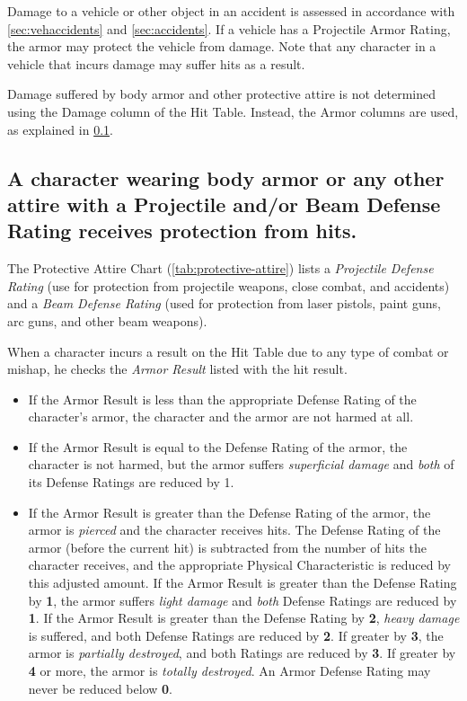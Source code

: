 Damage to a vehicle or other object in an accident is assessed in
accordance with \ref{sec:vehaccidents} and \ref{sec:accidents}. If a
vehicle has a Projectile Armor Rating, the armor may protect the
vehicle from damage. Note that any character in a vehicle that incurs
damage may suffer hits as a result.

Damage suffered by body armor and other protective attire is not
determined using the Damage column of the Hit Table. Instead, the
Armor columns are used, as explained in \ref{sec:armor-defense}.


\subsection[Protection from Armor]{A character wearing body armor or
  any other attire with a 
  Projectile and/or Beam Defense Rating receives protection from
  hits.}
\label{sec:armor-defense}



The Protective Attire Chart (\ref{tab:protective-attire}) lists a
\emph{Projectile Defense Rating} (use for protection from projectile weapons,
close combat, and accidents) and a \emph{Beam Defense Rating} (used for
protection from laser pistols, paint guns, arc guns, and other beam
weapons).

When a character incurs a result on the Hit Table due to any type of
combat or mishap, he checks the \emph{Armor Result} listed with the
hit result.

\begin{itemize}
\item If the Armor Result is less than the appropriate Defense Rating
  of the character's armor, the character and the armor are not harmed
  at all.
\item If the Armor Result is equal to the Defense Rating of the armor,
  the character is not harmed, but the armor suffers \emph{superficial
    damage} and \emph{both} of its Defense Ratings are reduced by 1.
\item If the Armor Result is greater than the Defense Rating of the
  armor, the armor is \emph{pierced} and the character receives hits.
  The Defense Rating of the armor (before the current hit) is
  subtracted from the number of hits the character receives, and the
  appropriate Physical Characteristic is reduced by this adjusted
  amount. If the Armor Result is greater than the Defense Rating by
  \textbf{1}, the armor suffers \emph{light damage} and \emph{both}
  Defense Ratings are reduced by \textbf{1}. If the Armor Result is
  greater than the Defense Rating by \textbf{2}, \emph{heavy damage}
  is suffered, and both Defense Ratings are reduced by \textbf{2}. If
  greater by \textbf{3}, the armor is \emph{partially destroyed}, and
  both Ratings are reduced by \textbf{3}. If greater by \textbf{4} or
  more, the armor is \emph{totally destroyed}. An Armor Defense Rating
  may never be reduced below \textbf{0}.
\end{itemize}

